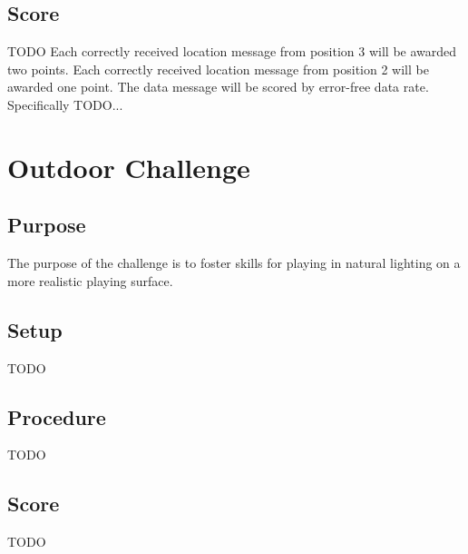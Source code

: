 \documentclass[12pt]{article}
\begin{document}
\subsection{Score}
TODO
Each correctly received location message from position 3 will be awarded two points. Each correctly received location message from position 2 will be awarded one point.
The data message will be scored by error-free data rate. Specifically TODO...

\newpage



\section{Outdoor Challenge}

\subsection{Purpose}

The purpose of the challenge is to foster skills for playing in natural lighting on a more realistic playing surface.

\subsection{Setup}
TODO

\subsection{Procedure}
TODO 

\subsection{Score}
TODO
\end{document}
